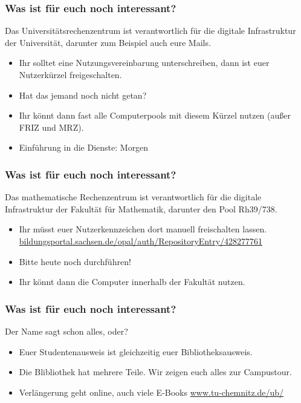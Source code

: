 \begin{frame}
\frametitle{Was ist für euch noch interessant?}
\begin{block}{\vphantom{X}}
	Das Universitätsrechenzentrum ist verantwortlich für die digitale Infrastruktur der Universität, darunter zum Beispiel auch eure Mails.
\end{block}
\begin{itemize}
	\item Ihr solltet eine Nutzungsvereinbarung unterschreiben, dann ist euer Nutzerkürzel freigeschalten.
	\item Hat das jemand noch nicht getan?
	\item Ihr könnt dann fast alle Computerpools mit diesem Kürzel nutzen (außer FRIZ und MRZ).
	\item Einführung in die Dienste: Morgen
\end{itemize}
\end{frame}

\begin{frame}
\frametitle{Was ist für euch noch interessant?}
\begin{block}{\vphantom{X}}
	Das mathematische Rechenzentrum ist verantwortlich für die digitale Infrastruktur der Fakultät für Mathematik, darunter den Pool Rh39/738.
\end{block}
\begin{itemize}
	\item Ihr müsst euer Nutzerkennzeichen dort manuell freischalten lassen. \href{https://bildungsportal.sachsen.de/opal/auth/RepositoryEntry/428277761}{bildungsportal.sachsen.de/opal/auth/RepositoryEntry/428277761}
	\item Bitte heute noch durchführen!
	\item Ihr könnt dann die Computer innerhalb der Fakultät nutzen.
\end{itemize}
\end{frame}

\begin{frame}
\frametitle{Was ist für euch noch interessant?}
\begin{block}{\vphantom{X}}
	Der Name sagt schon alles, oder?
\end{block}
\begin{itemize}
	\item Euer Studentenausweis ist gleichzeitig euer Bibliotheksausweis.
	\item Die Blibliothek hat mehrere Teile. Wir zeigen euch alles zur Campustour.
	\item Verlängerung geht online, auch viele E-Books \href{https://www.tu-chemnitz.de/ub/}{www.tu-chemnitz.de/ub/}
\end{itemize}
\end{frame}

